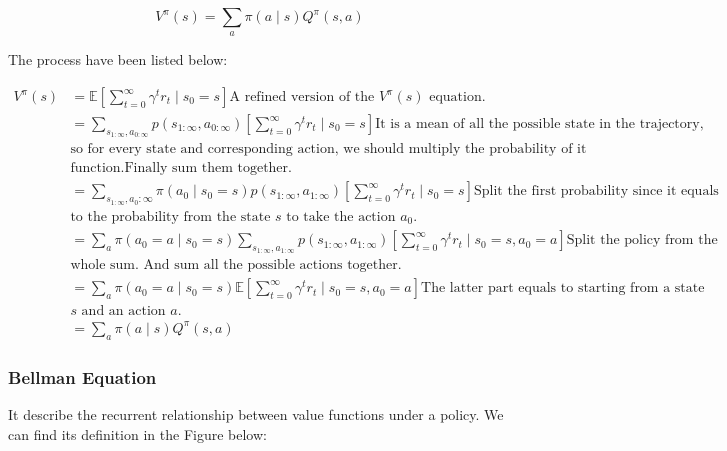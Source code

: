 \documentclass[11pt]{article}
\begin{document}
$$V^{\pi}(s)=\sum_{a} \pi(a \mid s) Q^{\pi}(s, a)$$

The process have been listed below: 

\begin{align*}
V^{\pi}(s) &=\mathbb{E}\left[\sum_{t=0}^{\infty} \gamma^{t} r_{t} \mid s_{0}=s\right] \text{A refined version of the $V^{\pi}(s)$ equation.} \\
&=\sum_{s_{1: \infty}, a_{0: \infty}} p\left(s_{1: \infty}, a_{0: \infty}\right)\left[\sum_{t=0}^{\infty} \gamma^{t} r_{t} \mid s_{0}=s\right] \text{It is a mean of all the possible state in the trajectory,} \\ & \text{so for every state and corresponding action, we should multiply the probability of it with reward } \\ & \text{function.Finally sum them together.}\\
&=\sum_{s_{1: \infty}, a_{0}: \infty} \pi\left(a_{0} \mid s_{0}=s\right) p\left(s_{1: \infty}, a_{1: \infty}\right)\left[\sum_{t=0}^{\infty} \gamma^{t} r_{t} \mid s_{0}=s\right] \text{Split the first probability since it equals } \\ & \text{to the probability from the state $s$ to take the action $a_0$.} \\
&=\sum_{a} \pi\left(a_{0}=a \mid s_{0}=s\right) \sum_{s_{1: \infty}, a_{1: \infty}} p\left(s_{1: \infty}, a_{1: \infty}\right)\left[\sum_{t=0}^{\infty} \gamma^{t} r_{t} \mid s_{0}=s, a_{0}=a\right] \text{Split the policy from the } \\ & \text{whole sum. And sum all the possible actions together.}\\
&=\sum_{a} \pi\left(a_{0}=a \mid s_{0}=s\right) \mathbb{E}\left[\sum_{t=0}^{\infty} \gamma^{t} r_{t} \mid s_{0}=s, a_{0}=a\right] \text{The latter part equals to starting from a state } \\ & \text{$s$ and an action $a$.}\\
&=\sum_{a} \pi(a \mid s) Q^{\pi}(s, a)
\end{align*}

\subsubsection{Bellman Equation}
It describe the recurrent relationship between value functions under a policy. We can find its definition in the Figure below:
\end{document}
